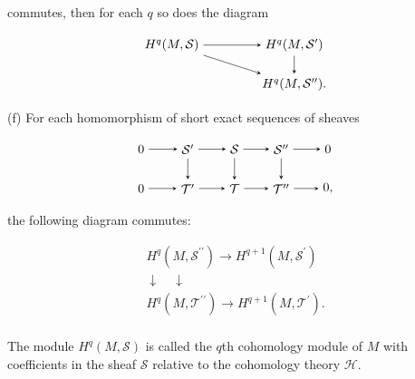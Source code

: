 \begin{definition}
commutes, then for each $q$ so does the diagram

\[
\begin{tikzpicture}[baseline={(current bounding box.center)},>=stealth]
\node (S) at (0,1.1) {$H^{q}(M,\mathcal{S})$};
\node (S1) at (3.4,1.1) {$H^{q}(M,\mathcal{S}')$};
\node (S2) at (3.4,0) {$H^{q}(M,\mathcal{S}'').$};
\draw[->] (S) -- (S1);
\draw[->] (S1) -- (S2);
\draw[->] (S) -- (S2);
\end{tikzpicture}
\]

(f) For each homomorphism of short exact sequences of sheaves

\[
\begin{tikzpicture}[baseline={(current bounding box.center)},>=stealth]
\node (z1) at (0,1.1) {$0$}; \node (S1) at (1.3,1.1) {$\mathcal{S}'$}; \node (S) at (2.6,1.1) {$\mathcal{S}$}; \node (S2) at (3.9,1.1) {$\mathcal{S}''$}; \node (z2) at (5.2,1.1) {$0$};
\node (w1) at (0,0) {$0$}; \node (T1) at (1.3,0) {$\mathcal{T}'$}; \node (T) at (2.6,0) {$\mathcal{T}$}; \node (T2) at (3.9,0) {$\mathcal{T}''$}; \node (w2) at (5.2,0) {$0,$};
\foreach \A/\B in {z1/S1,S1/S,S/S2,S2/z2,w1/T1,T1/T,T/T2,T2/w2,S1/T1,S/T,S2/T2}{\draw[->] (\A) -- (\B);}
\end{tikzpicture}
\]

the following diagram commutes:

\[
\begin{matrix}{H^{q}(M,\mathcal{S}^{\prime\prime})\to H^{q+1}(M,\mathcal{S}^{\prime})}\\ {\downarrow\quad\downarrow}\\ {H^{q}(M,\mathcal{T}^{\prime\prime})\to H^{q+1}(M,\mathcal{T}^{\prime}).}\\ \end{matrix}
\]

The module $H^{q}(M,\mathcal{S})$ is called the $q$th cohomology module of $M$ with coefficients in the sheaf $\mathcal{S}$ relative to the cohomology theory $\mathcal{H}$.

\end{definition}

